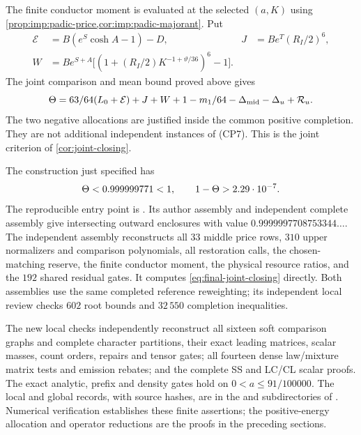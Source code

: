 The finite conductor moment is evaluated at the selected $(a,K)$
using \cref{prop:imp:padic-price,cor:imp:padic-majorant}. Put
\begin{align*}
 \mathcal E&=B(e^S\cosh A-1)-D,&
 J&=Be^T(R_I/2)^6,\\
 W&=Be^{S+A}\bigl[(1+(R_I/2)K^{-1+\vartheta/36})^6-1\bigr].
\end{align*}
The joint comparison and mean bound proved above gives
\begin{equation}\label{eq:final-joint-closing}
 \Theta=\frac{63}{64}(L_0+\mathcal E)+J+W+
 \frac{1-m_1}{64}-\Delta_{\rm mid}-\Delta_u+\mathcal R_u.
\end{equation}
The two negative allocations are justified inside the common
positive completion. They are not additional independent instances
of (CP7). This is the joint criterion of \cref{cor:joint-closing}.



\begin{certificate}\label{cert:four-routes-closing}
The construction just specified has
\[
 \Theta<\FourRoutesTheta<1,\qquad
 1-\Theta>2.29\cdot10^{-7}.
\]
The reproducible entry point is
.
Its author assembly and independent complete assembly give intersecting
outward enclosures with value
$0.9999997708753344\ldots$.
The independent assembly reconstructs all $33$ middle price rows,
$310$ upper normalizers and comparison polynomials, all restoration
calls, the chosen-matching reserve, the finite conductor moment,
the physical resource ratios, and the $192$ shared residual gates.
It computes \eqref{eq:final-joint-closing} directly. Both assemblies
use the same completed reference reweighting; its independent local
review checks $602$ root bounds and $32\,550$ completion inequalities.

The new local checks independently reconstruct all sixteen soft
comparison graphs and complete character partitions, their exact
leading matrices, scalar masses, count orders, repairs and tensor
gates; all fourteen dense law/mixture matrix tests and emission
rebates; and the complete SS and LC/CL scalar proofs. The exact
analytic, prefix and density gates hold on $0<a\le91/100000$.
The local and global records, with source hashes, are in the
 and  subdirectories of
. Numerical verification establishes these finite
assertions; the positive-energy allocation and operator reductions
are the proofs in the preceding sections.
\end{certificate}

